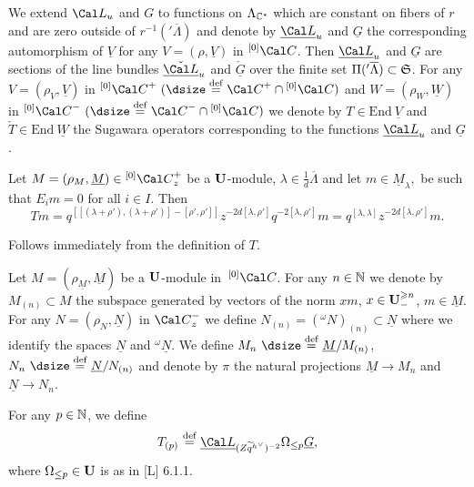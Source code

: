 We extend ${\Cal L}_u$  and $G$ to functions on  $\Lambda_{{\Bbb C}^*}$  which
are constant on fibers of $r$ and are zero outside of
$r^{-1}('\overline{\Lambda})$
and denote by  $\underline{\Cal L}_u$  and  $\underline{G}$  the corresponding
automorphism of  $\underline{V}$  for any  $V = (\rho, \underline{V})$  in
${}^{[0]}{\Cal C}$.  Then $\underline{\Cal L}_u$  and $\underline{G}$  are
sections of the line bundles  $\check{\underline{\Cal L}}_u$	 and
$\check{\underline{G}}$  over the finite set  $\Pi('\overline{\Lambda})
\subset {\frak S}$.  For any  $V = (\rho_V, \underline{V})$  in
${}^{[0]}{\Cal C}^+\ ({\dsize\buildrel{\text{def}}\over =}\  {\Cal C}^+ \cap
{}^{[0]}{\Cal C})$  and  $W = (\rho_W, \underline{W})$ in
${}^{[0]}{\Cal C}^-\ ({\dsize\buildrel{\text{def}}\over =}\ {\Cal C}^- \cap
{}^{[0]}{\Cal C})$  we denote by  $T \in \text{End}\ \underline{V}$  and
$\check{T} \in \text{End}\ \underline{W}$  the Sugawara operators
corresponding to the functions  $\underline{\Cal L}_u$  and $\underline{G}$.

  Let $M = (\rho_M,\underline{M}) \in
{}^{[0]}{\Cal C}^+_z$  be a ${\bold U}$-module, $\lambda \in
{\frac{1}{d}} \overline{\Lambda}$ and
let $m \in \underline{M}_{\lambda},$  be such that  $E_im = 0$  for all
$i \in I$.  Then
$$
Tm = q^{[[(\lambda + \rho'), (\lambda + \rho')] - [\rho',\rho']]}
z^{-2d[\lambda,\rho']} q^{-2[\lambda,\rho']}m =
q^{[\lambda,\lambda]} z^{-2d[\lambda,\rho']} m .
$$
\endproclaim

  Follows immediately from the definition of $T$.

  Let  $M = (\rho_{\underline{M}}, \underline{M})$
be a ${\bold U}$-module in\ ${}^{[0]}{\Cal C}$.  For
any $n \in {\Bbb N}$  we denote
by $M_{(n)} \subset M$  the subspace generated by vectors of the norm
$xm$, $x \in {\bold U}^{\geqslant n}_-$, $m \in \underline{M}$.
For any $N = (\rho_N, \underline{N})$ in ${\Cal C}^-_z$  we define
$N_{(n)} = ({}^\omega N)_{(n)} \subset \underline{N}$  where we identify the
spaces
$\underline{N}$ and ${}^\omega \underline{N}$.  We define
$M_n\ {\dsize\buildrel{\text{def}}\over =}\ \underline{M}/M_{(n)}$,\
$N_n\ {\dsize\buildrel{\text{def}}\over =}\ \underline{N}/N_{(n)}$
and denote by $\pi$ the natural projections $\underline{M} \to M_n$ and
$\underline{N} \to N_n$.

  For any  $p \in {\Bbb N}$, we define
$$
T_{(p)}\ {\buildrel{\text{def}}\over =}\
\underline{\Cal L}_{(Z\widetilde{q}^{h^\vee})^{-2}}
\Omega_{\le p} \underline{G},
$$
where  $\Omega_{\le p} \in {\bold U}$  is as in [L] 6.1.1.

